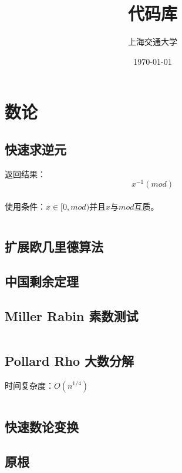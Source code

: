 \documentclass[a4paper]{article}
\title{代码库}
\author{上海交通大学}
\date{\today}
\newcommand{\cppcode}[1]{
    \inputminted[mathescape]{cpp}{source/#1}
}
\begin{document}
\maketitle

\tableofcontents

\clearpage

\section{数论}

\subsection{快速求逆元}

返回结果：$$x^{-1}(mod)$$\\
\indent 使用条件：$x \in [0, mod)$并且$x$与$mod$互质。

\cppcode{number-theory/inverse.cpp}

\subsection{扩展欧几里德算法}


\subsection{中国剩余定理}


\subsection{Miller Rabin 素数测试}

\cppcode{number-theory/miller-rabin.cpp}

\subsection{Pollard Rho 大数分解}

时间复杂度：$O(n^{1/4})$

\cppcode{number-theory/pollard-rho.cpp}

\subsection{快速数论变换}

\subsection{原根}
\end{document}
